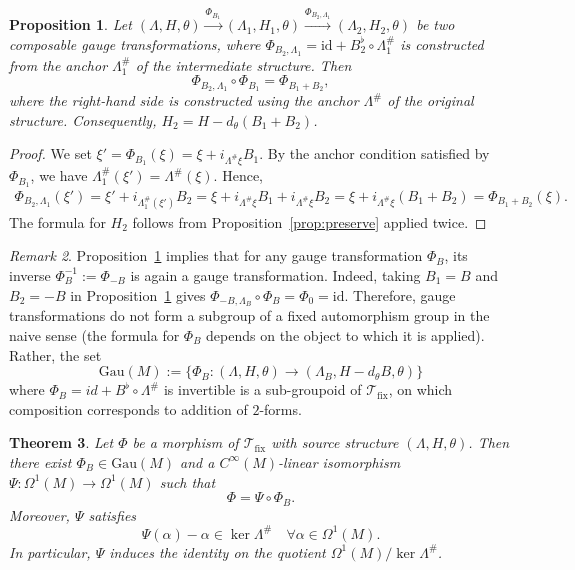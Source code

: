 \documentclass[11pt,a4paper]{article}
\theoremstyle{plain}
\newtheorem{theorem}{Theorem}[section]
\newtheorem{proposition}[theorem]{Proposition}
\theoremstyle{definition}
\theoremstyle{remark}
\newtheorem{remark}[theorem]{Remark}
\begin{document}
 \begin{proposition}
 	\label{prop:gauge}
 	Let $(\Lambda,H,\theta)\xrightarrow{\Phi_{B_1}}(\Lambda_{1},H_{1},\theta)
 	\xrightarrow{\Phi_{B_2,\Lambda_1}}(\Lambda_{2},H_{2},\theta)$ be two composable gauge transformations, where
 	$\Phi_{B_2,\Lambda_1}=\mathrm{id}+B_2^{\flat}\circ\Lambda_1^{\#}$ is constructed from the anchor $\Lambda_1^{\#}$ of the intermediate structure.
 	Then
 	$$
 	\Phi_{B_2,\Lambda_1}\circ\Phi_{B_1}=\Phi_{B_1+B_2},
 	$$
 	where the right-hand side is constructed using the anchor $\Lambda^{\#}$ of the original structure.
 	Consequently, $H_{2}=H-d_{\theta}(B_{1}+B_{2})$.
 \end{proposition}

\begin{proof}
	We set $\xi'=\Phi_{B_1}(\xi)=\xi+i_{\Lambda^{\#}\xi}B_1$. By the anchor condition satisfied by
	$\Phi_{B_1}$, we have $\Lambda_1^{\#}(\xi')=\Lambda^{\#}(\xi)$. Hence,
	\begin{align*}
		\Phi_{B_2,\Lambda_1}(\xi')
		=\xi' + i_{\Lambda_1^{\#}(\xi')}B_2 =\xi + i_{\Lambda^{\#}\xi}B_1 + i_{\Lambda^{\#}\xi}B_2 =\xi + i_{\Lambda^{\#}\xi}(B_1+B_2) =\Phi_{B_1+B_2}(\xi).
	\end{align*}
	The formula for $H_2$ follows from Proposition~\ref{prop:preserve} applied twice.
\end{proof}

\begin{remark}
	Proposition~\ref{prop:gauge} implies that for any gauge transformation $\Phi_B$, its inverse
	$\Phi_B^{-1}:=\Phi_{-B}$ is again a gauge transformation.
	Indeed, taking $B_1=B$ and $B_2=-B$ in Proposition~\ref{prop:gauge} gives
	$\Phi_{-B,\Lambda_B}\circ\Phi_B=\Phi_0=\mathrm{id}$.
	Therefore, gauge transformations do not form a subgroup of a fixed automorphism group
	in the naive sense (the formula for $\Phi_B$ depends on the object to which it is applied).
	Rather, the set
	$$
	\mathrm{Gau}(M):=\bigl\{\Phi_B:(\Lambda,H,\theta)\rightarrow(\Lambda_B,H-d_\theta B,\theta)\bigr\}
	$$
	where $\Phi_B=id+B^\flat\circ\Lambda^\#$ is invertible is a sub-groupoid of $\mathcal{T}_{\mathrm{fix}}$, on which composition corresponds to addition of $2$-forms.
\end{remark}



\begin{theorem}\label{thm:classification}
	Let $\Phi$ be a morphism of  $\mathcal{T}_{\mathrm{fix}}$ with source structure $(\Lambda,H,\theta)$.
	Then there exist $\Phi_B\in \mathrm{Gau}(M)$ and a $C^\infty(M)$-linear isomorphism
	$\Psi:\Omega^1(M)\to\Omega^1(M)$ such that
	$$
	\Phi=\Psi\circ\Phi_B.
	$$
	Moreover, $\Psi$ satisfies
	$$
	\Psi(\alpha)-\alpha \in \ker \Lambda^\# \quad \forall \alpha\in\Omega^1(M).
	$$
	In particular, $\Psi$ induces the identity on the quotient $\Omega^1(M)/\ker\Lambda^\#$.
\end{theorem}
\end{document}
